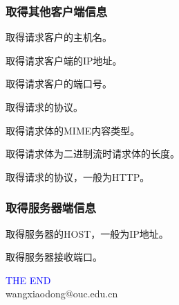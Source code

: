 \begin{frame}[fragile] %
  \frametitle{取得其他客户端信息} 

   取得请求客户的主机名。

   取得请求客户端的IP地址。

   取得请求客户的端口号。

   取得请求的协议。
  
   取得请求体的MIME内容类型。

   取得请求体为二进制流时请求体的长度。

   取得请求的协议，一般为HTTP。
\end{frame}

\begin{frame}[fragile] %
  \frametitle{取得服务器端信息} 

   取得服务器的HOST，一般为IP地址。

   取得服务器接收端口。
\end{frame}
\begin{frame}
\centering
{\Huge \textcolor{blue}{THE END}} \\
\vspace{5mm}
{\Large wangxiaodong@ouc.edu.cn} \\
\end{frame}

